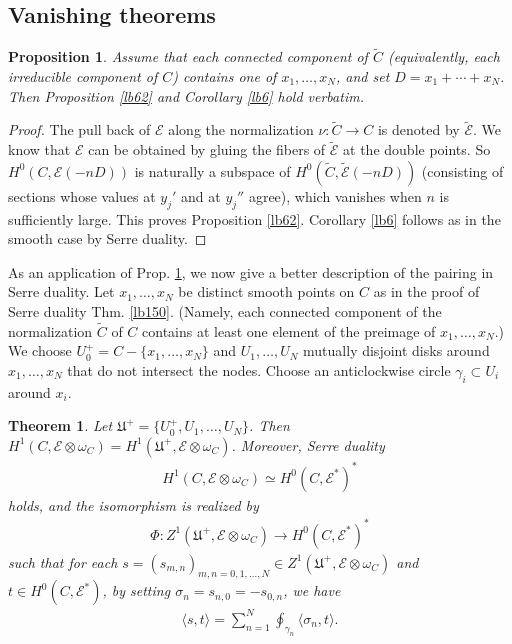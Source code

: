 \documentclass[12pt,b5paper,notitlepage]{report}
\theoremstyle{definition}
\theoremstyle{plain}
\newtheorem{thm}[df]{Theorem}
\newtheorem{pp}[df]{Proposition}
\newcommand{\fk}{\mathfrak}
\newcommand{\wtd}{\widetilde}
\newcommand{\bk}[1]{\langle {#1}\rangle}
\newcommand{\scr}{\mathscr}
\numberwithin{equation}{section}
\begin{document}
\subsection*{Vanishing theorems}







\begin{pp}\label{lb121}
Assume that each connected component of $\wtd C$ (equivalently, each irreducible component of $C$) contains one of $x_1,\dots,x_N$, and set $D=x_1+\cdots+x_N$. Then Proposition \ref{lb62} and Corollary \ref{lb6} hold verbatim.
\end{pp}


\begin{proof}
The pull back of $\scr E$ along the normalization $\nu:\wtd C\rightarrow C$ is denoted by $\wtd{\scr E}$. We know that $\scr E$ can be obtained by gluing the fibers of $\wtd{\scr E}$ at the double points.  So $H^0(C,\scr E(-nD))$ is naturally a subspace of $H^0(\wtd C,\wtd{\scr E}(-nD))$ (consisting of sections whose values at $y_j'$ and at $y_j''$ agree), which vanishes when $n$ is sufficiently large. This proves Proposition \ref{lb62}. Corollary \ref{lb6} follows as in the smooth case by Serre duality.
\end{proof}



As an application of Prop. \ref{lb121}, we now give a better description of the pairing in Serre duality. Let $x_1,\dots,x_N$ be distinct smooth points on $C$ as in the proof of Serre duality Thm. \ref{lb150}. (Namely, each connected component of the normalization $\wtd C$ of $C$ contains at least one element of the preimage of $x_1,\dots,x_N$.)  We choose $U_0^+=C-\{x_1,\dots,x_N\}$ and $U_1,\dots,U_N$ mutually disjoint disks around $x_1,\dots,x_N$ that do not intersect the nodes. Choose an anticlockwise circle $\gamma_i\subset U_i$ around $x_i$. 

\begin{thm}
Let $\fk U^+=\{U_0^+,U_1,\dots,U_N\}$. Then $H^1(C,\scr E\otimes\omega_C)=H^1(\fk U^+,\scr E\otimes\omega_C)$. Moreover, Serre duality
\begin{align}
H^1(C,\scr E\otimes\omega_C)\simeq H^0(C,\scr E^*)^*
\end{align}
holds, and the isomorphism is realized by
\begin{align}
\Phi :Z^1(\fk U^+,\scr E\otimes\omega_C)\rightarrow H^0(C,\scr E^*)^*
\end{align}
such that for each $s=(s_{m,n})_{m,n=0,1,\dots,N}\in Z^1(\fk U^+,\scr E\otimes\omega_C)$ and $t\in H^0(C,\scr E^*)$, by setting $\sigma_n=s_{n,0}=-s_{0,n}$, we have
\begin{align}
\bk{s,t}=\sum_{n=1}^N\oint_{\gamma_n}\bk{\sigma_n,t}.
\end{align}
\end{thm}
\end{document}
